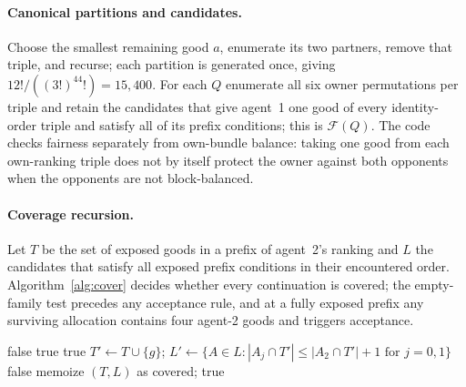 \documentclass[11pt]{article}
\theoremstyle{definition}
\begin{document}
\paragraph{Canonical partitions and candidates.}
Choose the smallest remaining good $a$, enumerate its two partners, remove that triple, and recurse; each partition is generated once, giving $12!/((3!)^44!)=15{,}400$. For each $Q$ enumerate all six owner permutations per triple and retain the candidates that give agent~1 one good of every identity-order triple and satisfy all of its prefix conditions; this is $\mathcal F(Q)$. The code checks fairness separately from own-bundle balance: taking one good from each own-ranking triple does not by itself protect the owner against both opponents when the opponents are not block-balanced.

\paragraph{Coverage recursion.}
Let $T$ be the set of exposed goods in a prefix of agent~2's ranking and $L$ the candidates that satisfy all exposed prefix conditions in their encountered order. Algorithm~\ref{alg:cover} decides whether every continuation is covered; the empty-family test precedes any acceptance rule, and at a fully exposed prefix any surviving allocation contains four agent-2 goods and triggers acceptance.

\begin{algorithm}[h]
\caption{\textsc{Cover}$(T,L)$ for a fixed partition $Q$}\label{alg:cover}
\begin{algorithmic}[1]
 \RETURN false \ENDIF
{} \RETURN true \ENDIF
{} \RETURN true \ENDIF
{}
  \STATE $T'\gets T\cup\{g\}$; $L'\gets\{A\in L: |A_j\cap T'|\le |A_2\cap T'|+1\text{ for }j=0,1\}$
   \RETURN false \ENDIF
\ENDFOR
\STATE memoize $(T,L)$ as covered; \RETURN true
\end{algorithmic}
\end{algorithm}
\end{document}
